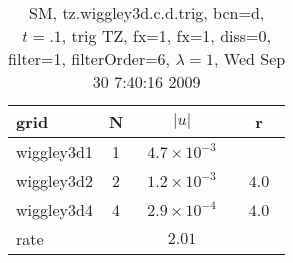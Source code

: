 \begin{table}[hbt]\tableFont %
\begin{center}
\begin{tabular}{|l|c|c|c|} \hline 
grid  & N &  $\vert u \vert$   & r \\ \hline 
          wiggley3d1 &     1 & ~$4.7\times10^{ -3}$~ &            \\ \hline
          wiggley3d2 &     2 & ~$1.2\times10^{ -3}$~ & ~$  4.0$~  \\ \hline
          wiggley3d4 &     4 & ~$2.9\times10^{ -4}$~ & ~$  4.0$~  \\ \hline
    rate             &       &       $2.01$         &        \\ \hline
\end{tabular}
\caption{SM, tz.wiggley3d.c.d.trig, bcn=d, $t=.1$, trig TZ, fx=1, fx=1, diss=0, filter=1, filterOrder=6, $\lambda=1$, Wed Sep 30  7:40:16 2009}\label{table:tz.wiggley3d.c.d.trig}
\end{center}
\end{table}
